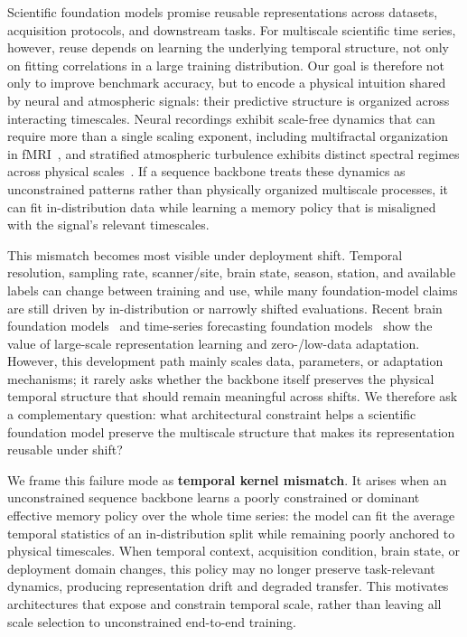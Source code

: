 \documentclass{article}
\begin{document}
Scientific foundation models promise reusable representations across datasets, acquisition protocols, and downstream tasks. For multiscale scientific time series, however, reuse depends on learning the underlying temporal structure, not only on fitting correlations in a large training distribution. Our goal is therefore not only to improve benchmark accuracy, but to encode a physical intuition shared by neural and atmospheric signals: their predictive structure is organized across interacting timescales. Neural recordings exhibit scale-free dynamics that can require more than a single scaling exponent, including multifractal organization in fMRI~\citep{he2011scale,ciuciu2012scale,bae2025spatiotemporal}, and stratified atmospheric turbulence exhibits distinct spectral regimes across physical scales~\citep{cheng2020model}. If a sequence backbone treats these dynamics as unconstrained patterns rather than physically organized multiscale processes, it can fit in-distribution data while learning a memory policy that is misaligned with the signal's relevant timescales.

This mismatch becomes most visible under deployment shift. Temporal resolution, sampling rate, scanner/site, brain state, season, station, and available labels can change between training and use, while many foundation-model claims are still driven by in-distribution or narrowly shifted evaluations. Recent brain foundation models~\citep{tak2026generalizable,wang2025towards,wang2025slim,wang2026omni} and time-series forecasting foundation models~\citep{abhimanyu2024decoder,ansari2024chronos,woo2024unified} show the value of large-scale representation learning and zero-/low-data adaptation.
However, this development path mainly scales data, parameters, or adaptation mechanisms; it rarely asks whether the backbone itself preserves the physical temporal structure that should remain meaningful across shifts. We therefore ask a complementary question: what architectural constraint helps a scientific foundation model preserve the multiscale structure that makes its representation reusable under shift?

We frame this failure mode as \textbf{temporal kernel mismatch}. It arises when an unconstrained sequence backbone learns a poorly constrained or dominant effective memory policy over the whole time series: the model can fit the average temporal statistics of an in-distribution split while remaining poorly anchored to physical timescales. When temporal context, acquisition condition, brain state, or deployment domain changes, this policy may no longer preserve task-relevant dynamics, producing representation drift and degraded transfer. This motivates architectures that expose and constrain temporal scale, rather than leaving all scale selection to unconstrained end-to-end training.
\end{document}
